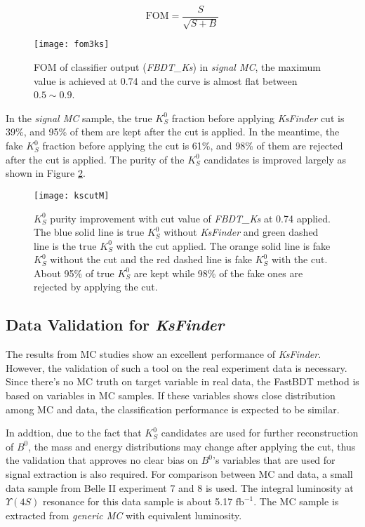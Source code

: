 \begin{equation}\label{eq:fom}
	\text{FOM} = \frac{S}{\sqrt{S+B}}
\end{equation}

\begin{figure}[H]
	\centering
	\texttt{[image: fom3ks]}
	\caption{FOM of classifier output (\textit{FBDT\_Ks}) in \textit{signal MC}, the maximum value is achieved at 0.74 and the curve is almost flat between $0.5\sim 0.9$.}
	\label{fig:ks_fom}
\end{figure}

In the \textit{signal MC} sample, the true $K_S^0$ fraction before applying \textit{KsFinder} cut is 39\%, and 95\% of them are kept after the cut is applied. In the meantime, the fake $K_S^0$ fraction before applying the cut is 61\%, and 98\% of them are rejected after the cut is applied. The purity of the $K_S^0$ candidates is improved largely as shown in Figure \ref{fig:ks_cutused}.

\begin{figure}[htpb]
	\centering
	\texttt{[image: kscutM]}
	\caption{$K_S^0$ purity improvement with cut value of \textit{FBDT\_Ks} at 0.74 applied. The blue solid line is true $K_S^0$ without \textit{KsFinder} and green dashed line is the true $K_S^0$ with the cut applied. The orange solid line is fake $K_S^0$ without the cut and the red dashed line is fake $K_S^0$ with the cut. About 95\% of true $K_S^0$ are kept while 98\% of the fake ones are rejected by applying the cut.}
	\label{fig:ks_cutused}
\end{figure}

\subsection{Data Validation for \textit{KsFinder}}
The results from MC studies show an excellent performance of \textit{KsFinder}. However, the validation of such a tool on the real experiment data is necessary. Since there's no MC truth on target variable in real data, the FastBDT method is based on variables in MC samples. If these variables shows close distribution among MC and data, the classification performance is expected to be similar.

In addtion, due to the fact that $K_S^0$ candidates are used for further reconstruction of $B^0$, the  mass and energy distributions may change after applying the cut, thus the validation that approves no clear bias on $B^0$'s variables that are used for signal extraction is also required. For comparison between MC and data, a small data sample from Belle II  experiment 7 and 8 is used. The integral luminosity at $\Upsilon(4S)$ resonance for this data sample is about 5.17 $\text{fb}^{-1}$. The MC sample is extracted from \textit{generic MC} with equivalent luminosity.


